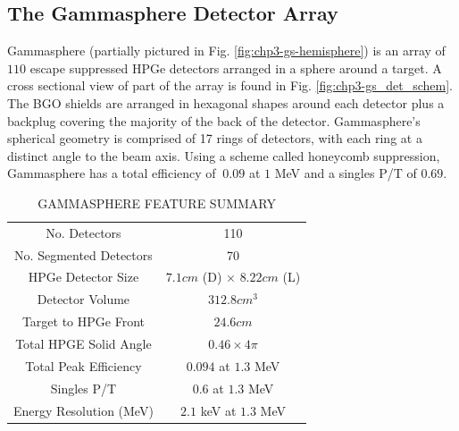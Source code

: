 \subsection{The Gammasphere Detector Array}
\label{ssec:exp-pr-gamma-gammasphere}
Gammasphere (partially pictured in Fig. \ref{fig:chp3-gs-hemisphere}) is an array of $110$ escape suppressed HPGe detectors arranged in a sphere around a target. A cross sectional view of part of the array is found in Fig. \ref{fig:chp3-gs_det_schem}. The BGO shields are arranged in hexagonal shapes around each detector plus a backplug covering the majority of the back of the detector. Gammasphere's spherical geometry is comprised of 17 rings of detectors, with each ring at a distinct angle to the beam axis. Using a scheme called honeycomb suppression, Gammasphere has a total efficiency of $~0.09$ at $1$ MeV and a singles P/T of $0.69$.


\begin{table}[hb!]
\caption{GAMMASPHERE FEATURE SUMMARY\label{tbl:gs-summary}}
\begin{center}
\begin{tabular}{|c|c|}
\toprule
No. Detectors             & 110 \\ 
No. Segmented Detectors   & 70 \\ 
HPGe Detector Size        & $7.1 cm$ (D) $\times$ $8.22 cm$ (L) \\
Detector Volume           & $312.8 cm^3$\\
Target to HPGe Front      & $24.6 cm$\\ 
Total HPGE Solid Angle    & $0.46 \times 4\pi$\\ 
Total Peak Efficiency     & $0.094$ at $1.3$ MeV\\ 
Singles P/T               & $0.6$ at $1.3$ MeV\\ 
Energy Resolution (MeV)   & $2.1$ keV at $1.3$ MeV \\ 
\bottomrule
\end{tabular}
\end{center}
\end{table}

